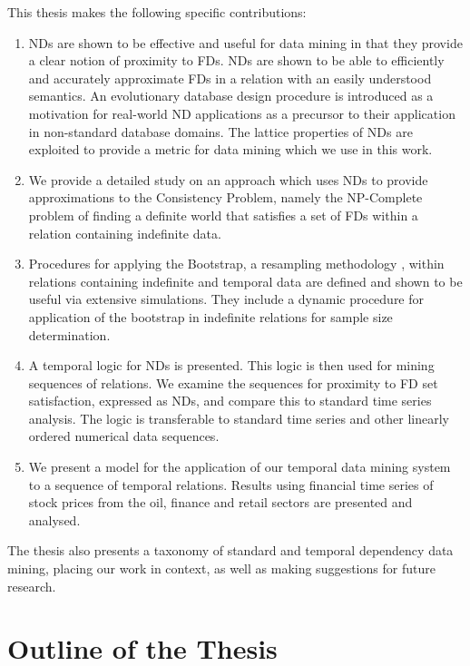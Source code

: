 \smallskip
\noindent This thesis makes the following specific contributions:
\begin{enumerate}
\item NDs are shown to be effective and useful for 
data mining in that they provide a clear notion of proximity to FDs.
NDs are shown to be able to efficiently and accurately approximate FDs
in a relation with an easily understood semantics. 
An evolutionary database design procedure is introduced as a 
motivation for real-world ND applications as a precursor to their application
in non-standard database domains. The lattice properties of NDs are
exploited to provide a metric for data mining which we use in this work. 
\item We provide a detailed study on an approach which uses NDs to
provide approximations to the Consistency Problem, namely the
NP-Complete problem of finding a definite world that satisfies a set
of FDs within a relation containing indefinite data. 
\item Procedures for applying the Bootstrap, a resampling methodology \cite{et93}, within relations containing
indefinite and temporal data are defined and shown to be useful via extensive
simulations. They include a dynamic procedure for application of the
bootstrap in indefinite relations for sample size determination. 
\item A temporal logic for NDs is presented. This logic is then used
for mining sequences of relations. We examine the sequences for proximity
to FD set satisfaction, expressed as NDs, and compare this
to standard time series 
analysis. The logic is transferable to standard time series and other
linearly ordered numerical data sequences.
\item We present a model for the application of our temporal data
mining system to a sequence of temporal relations. Results using
financial time series of stock prices from the oil,
finance and retail sectors are presented and analysed.
\end{enumerate}

The thesis also presents a taxonomy of standard and temporal 
dependency data mining, placing our work in context, as well as making
suggestions for future research. 

\section{Outline of the Thesis}\label{sec:int_outline}

